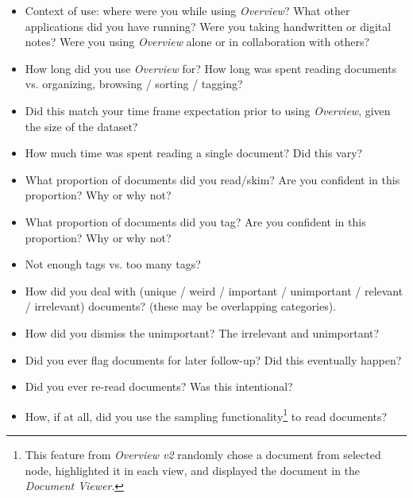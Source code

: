 \begin{itemize}
    \item Context of use: where were you while using {\it Overview}? What other applications did you have running? Were you taking handwritten or digital notes? Were you using {\it Overview} alone or in collaboration with others?
    \item How long did you use {\it Overview} for? How long was spent reading documents vs. organizing, browsing / sorting / tagging?
    \item Did this match your time frame expectation prior to using {\it Overview}, given the size of the dataset?
    \item How much time was spent reading a single document? Did this vary?
    \item What proportion of documents did you read/skim? Are you confident in this proportion? Why or why not?
    \item What proportion of documents did you tag? Are you confident in this proportion? Why or why not?
    \item Not enough tags vs. too many tags?
    \item How did you deal with (unique / weird / important / unimportant / relevant / irrelevant) documents? (these may be overlapping categories).
    \item How did you dismiss the unimportant? The irrelevant and unimportant?
    \item Did you ever flag documents for later follow-up? Did this eventually happen?
    \item Did you ever re-read documents? Was this intentional?
    \item How, if at all, did you use the sampling functionality\footnote{This feature from {\it Overview v2} randomly chose a document from selected node, highlighted it in each view, and displayed the document in the {\it Document Viewer}.} to read documents? 
\end{itemize}


